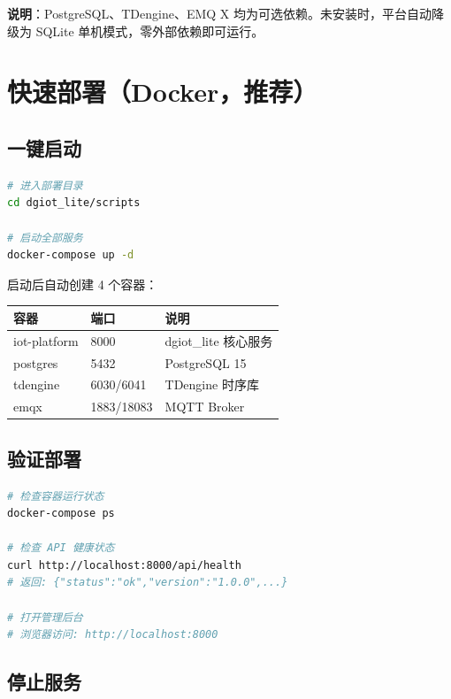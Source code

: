 \documentclass[12pt,a4paper]{ctexart}
\begin{document}
\noindent\textbf{说明}：PostgreSQL、TDengine、EMQ X 均为可选依赖。未安装时，平台自动降级为 SQLite 单机模式，零外部依赖即可运行。

\section{快速部署（Docker，推荐）}

\subsection{一键启动}

\begin{lstlisting}[language=bash]
# 进入部署目录
cd dgiot_lite/scripts

# 启动全部服务
docker-compose up -d
\end{lstlisting}

启动后自动创建 4 个容器：

\begin{table}[H]\centering
\begin{tabular}{p{3cm}p{2.5cm}p{5.5cm}}
\toprule\textbf{容器} & \textbf{端口} & \textbf{说明} \\
\midrule
iot-platform & 8000 & dgiot\_lite 核心服务 \\
postgres     & 5432 & PostgreSQL 15 \\
tdengine     & 6030/6041 & TDengine 时序库 \\
emqx         & 1883/18083 & MQTT Broker \\
\bottomrule
\end{tabular}
\end{table}

\subsection{验证部署}

\begin{lstlisting}[language=bash]
# 检查容器运行状态
docker-compose ps

# 检查 API 健康状态
curl http://localhost:8000/api/health
# 返回: {"status":"ok","version":"1.0.0",...}

# 打开管理后台
# 浏览器访问: http://localhost:8000
\end{lstlisting}

\subsection{停止服务}
\end{document}

